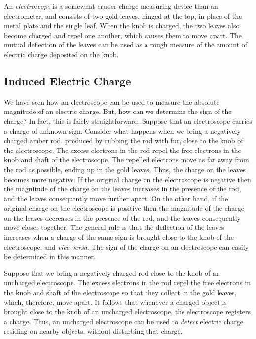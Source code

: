 An {\em electroscope}\/ is a somewhat cruder charge measuring device than an
electrometer, and  consists of two gold leaves, hinged at the
top,  in place of the metal plate and
the single leaf. When the knob is charged, the two leaves also become charged
and repel one another, which causes them to move apart. The mutual deflection
of the leaves can
be used as a rough measure of the amount of electric charge deposited on the knob. 

\subsection{Induced Electric Charge}\label{s3.4}
We have seen how an electroscope can be used to measure the absolute magnitude
of an electric charge. But, how can we determine the sign of the charge? In fact, this
is fairly straightforward. Suppose that an electroscope carries a charge 
of unknown sign. Consider what happens when we bring a negatively
charged amber rod, produced by rubbing the rod with fur, close to the knob of the
electroscope. The excess electrons in the rod repel the free electrons in the
knob and shaft of the electroscope. The repelled electrons move as far away
from the rod as possible, ending up in the gold leaves. Thus, the charge on the
leaves becomes more negative. If the original charge on the electroscope is
negative then the magnitude of the charge on the leaves increases in the
presence of the rod, and the leaves consequently move further apart. On the
other hand, if the original charge on the electroscope is
positive then the magnitude of the charge on the leaves decreases in the presence of the rod,
 and the leaves consequently move closer together. The general rule is that
the deflection of the leaves increases when a charge of the same sign is
brought close to the knob of the electroscope, and {\em vice versa}. The sign of the charge on 
an electroscope can easily be
determined in this manner.

Suppose that we bring a negatively charged rod close to the knob of an
uncharged electroscope. The excess electrons in the rod repel the free electrons
in the knob and shaft of the electroscope so that they collect in the gold
leaves, which, therefore, move apart.  It follows that  whenever a charged object is brought
close to the knob of an uncharged electroscope, the electroscope registers a
charge. Thus, an uncharged electroscope can be used to {\em detect}\/ electric charge
residing on nearby objects, without disturbing that charge. 

